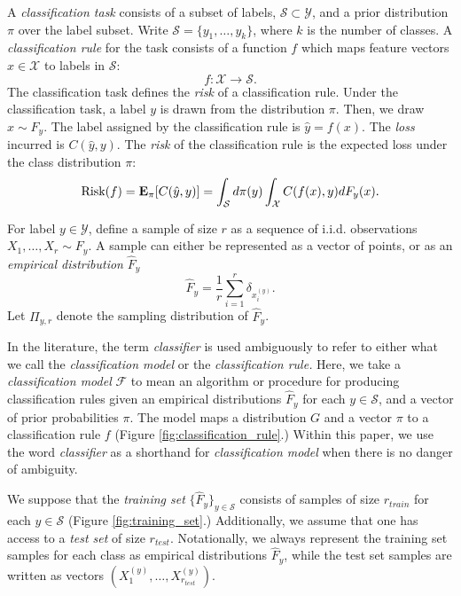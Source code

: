 \documentclass[12pt]{article}
\begin{document}
A \emph{classification task} consists of a subset of labels,
$\mathcal{S} \subset \mathcal{Y}$, and a prior distribution $\pi$ over
the label subset.  Write $\mathcal{S}=\{y_1,\hdots, y_k\}$, where $k$
is the number of classes.  A \emph{classification rule} for the task
consists of a function $f$ which maps feature vectors
$x \in \mathcal{X}$ to labels in $\mathcal{S}$:
\[
f: \mathcal{X} \to \mathcal{S}.
\]
The classification task defines the \emph{risk} of a classification
rule.  Under the classification task, a label $y$ is drawn from the
distribution $\pi$.  Then, we draw $x \sim F_y$.  The label assigned
by the classification rule is $\hat{y} = f(x)$.  The \emph{loss}
incurred is $C(\hat{y}, y)$.  The \emph{risk} of the classification
rule is the expected loss under the class distribution $\pi$:
\[
\text{Risk}(f) = \textbf{E}_\pi[C(\hat{y}, y)] = \int_\mathcal{S} d \pi(y) \int_{\mathcal{X}} C(f(x), y) dF_y(x).
\]

For label $y \in \mathcal{Y}$, define a sample of size $r$ as a
sequence of i.i.d. observations $X_1,\hdots, X_r \sim F_y$.
A sample can either be represented as a vector of points, or as
an \emph{empirical distribution} $\hat{F}_y$
\[\hat{F}_y = \frac{1}{r}\sum_{i=1}^r \delta_{x_i^{(y)}}.\]
Let $\Pi_{y, r}$ denote the sampling distribution of $\hat{F}_y$.

In the literature, the term \emph{classifier} is used ambiguously to
refer to either what we call the \emph{classification model} or
the \emph{classification rule.}  Here, we take a \emph{classification
model} $\mathcal{F}$ to mean an algorithm or procedure for producing
classification rules given an empirical distributions $\hat{F}_y$ for
each $y \in \mathcal{S}$, and a vector of prior probabilities $\pi$.
The model maps a distribution $G$ and a vector $\pi$ to a
classification rule $f$ (Figure \ref{fig:classification_rule}.)
Within this paper, we use the word \emph{classifier} as a shorthand
for \emph{classification model} when there is no danger of ambiguity.

We suppose that the \emph{training set}
$\{\hat{F}_y\}_{y \in \mathcal{S}}$ consists of samples of size
$r_{train}$ for each $y \in \mathcal{S}$
(Figure \ref{fig:training_set}.) Additionally, we assume that one has
access to a \emph{test set} of size $r_{test}$.  Notationally, we
always represent the training set samples for each class as empirical
distributions $\hat{F}_y$, while the test set samples are written as
vectors $(X^{(y)}_1,\hdots, X^{(y)}_{r_{test}})$.
\end{document}
